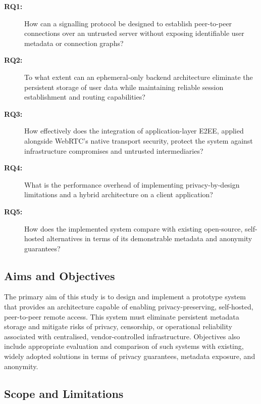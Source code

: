 \documentclass[12pt,a4paper]{article}
\begin{document}
\begin{description}

\item[\textbf{RQ1:}] How can a signalling protocol be designed to establish peer-to-peer connections over an untrusted server without exposing identifiable user metadata or connection graphs?

\item[\textbf{RQ2:}] To what extent can an ephemeral-only backend architecture eliminate the persistent storage of user data while maintaining reliable session establishment and routing capabilities?

\item[\textbf{RQ3:}] How effectively does the integration of application-layer E2EE, applied alongside WebRTC’s native transport security, protect the system against infrastructure compromises and untrusted intermediaries?

\item[\textbf{RQ4:}] What is the performance overhead of implementing privacy-by-design limitations and a hybrid architecture on a client application?

\item[\textbf{RQ5:}] How does the implemented system compare with existing open-source, self-hosted alternatives in terms of its demonstrable metadata and anonymity guarantees?

\end{description}

\subsection{Aims and Objectives}

The primary aim of this study is to design and implement a prototype system that provides an architecture capable of enabling privacy-preserving, self-hosted, peer-to-peer remote access. This system must eliminate persistent metadata storage and mitigate risks of privacy, censorship, or operational reliability associated with centralised, vendor-controlled infrastructure. Objectives also include appropriate evaluation and comparison of such systems with existing, widely adopted solutions in terms of privacy guarantees, metadata exposure, and anonymity.

\subsection{Scope and Limitations}
\end{document}
